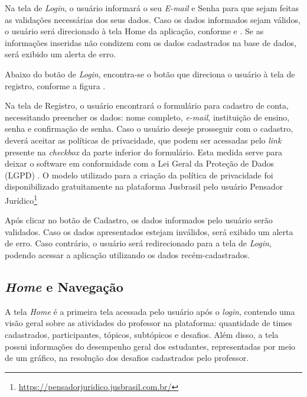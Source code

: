 
Na tela de \textit{Login}, o usuário informará o seu \textit{E-mail} e Senha para que sejam feitas as validações necessárias dos seus dados. Caso os dados informados sejam válidos, o usuário será direcionado à tela Home da aplicação, conforme 
 e . Se as informações inseridas não condizem com os dados cadastrados na base de dados, será exibido um alerta de erro. 

Abaixo do botão de \textit{Login}, encontra-se o botão que direciona o usuário à tela de registro, conforme a figura .


Na tela de Registro, o usuário encontrará o formulário para cadastro de conta, necessitando preencher os dados: nome completo, \textit{e-mail}, instituição de ensino, senha e confirmação de senha. Caso o usuário deseje prosseguir com o cadastro, deverá aceitar as políticas de privacidade, que podem ser acessadas pelo \textit{link} presente na \textit{checkbox} da parte inferior do formulário. Esta medida serve para deixar o software em conformidade com a Lei Geral da Proteção de Dados (LGPD) \cite{lgpd}. O modelo utilizado para a criação da política de privacidade foi disponibilizado gratuitamente na plataforma Jusbrasil pelo usuário Pensador Jurídico\footnote{\url{https://pensadorjuridico.jusbrasil.com.br/}} \cite{politica-privacidade}

Após clicar no botão de Cadastro, os dados informados pelo usuário serão validados. Caso os dados apresentados estejam inválidos, será exibido um alerta de erro. Caso contrário, o usuário será redirecionado para a tela de \textit{Login}, podendo acessar a aplicação utilizando os dados recém-cadastrados.

\subsection{\textit{Home} e Navegação}

A tela \textit{Home} é a primeira tela acessada pelo usuário após o \textit{login}, contendo uma visão geral sobre as atividades do professor na plataforma: quantidade de times cadastrados, participantes, tópicos, subtópicos e desafios. Além disso, a tela possui informações do desempenho geral dos estudantes, representadas por meio de um gráfico, na resolução dos desafios cadastrados pelo professor.


